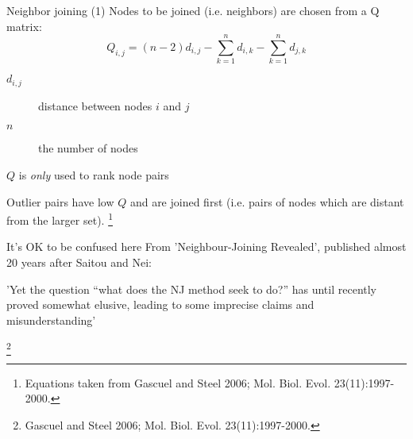 \documentclass[pdf]{beamer}
\newcommand\blfootnote[1]{%
  \begingroup  %
  \renewcommand\thefootnote{}\footnote{#1}%
  \addtocounter{footnote}{-1}  %
  \endgroup
}
\begin{document}
\begin{frame}{Neighbor joining (1)}
  Nodes to be joined (i.e. neighbors) are chosen from a Q matrix:
  $$
  Q_{i,j} = (n-2)d_{i,j} - \sum_{k=1}^n{d_{i,k}} - \sum_{k=1}^n{d_{j,k}}
  $$

  \begin{description}
  \item[$d_{i,j}$] distance between nodes $i$ and $j$
  \item[$n$] the number of nodes
  \end{description}
  
  $Q$ is \emph{only} used to rank node pairs
  
  Outlier pairs have low $Q$ and are joined first (i.e. pairs of nodes
  which are distant from the larger set).
\blfootnote{Equations taken from Gascuel and Steel 2006; Mol. Biol. Evol. 23(11):1997-2000.}
\end{frame}{

\begin{frame}{It's OK to be confused here}
  \pause
  From 'Neighbour-Joining Revealed', published almost 20 years after Saitou
  and Nei:

  'Yet the question ``what does the NJ method seek to do?'' has until recently
  proved somewhat elusive, leading to some imprecise claims and
  misunderstanding'

\blfootnote{Gascuel and Steel 2006; Mol. Biol. Evol. 23(11):1997-2000.}
\end{frame}

}
\end{document}
